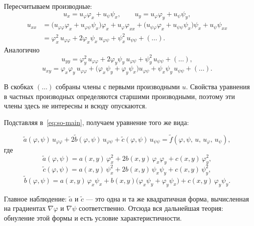 Пересчитываем производные:
\[
  u_x = u_\varphi \varphi_x + u_\psi \psi_x , \qquad
  u_y = u_\varphi \varphi_y + u_\psi \psi_y ,
\]
\begin{align*}
  u_{xx} &= \big(u_{\varphi\varphi}\varphi_x + u_{\varphi\psi}\psi_x\big)\varphi_x
          + u_\varphi \varphi_{xx}
          + \big(u_{\psi\varphi}\varphi_x + u_{\psi\psi}\psi_x\big)\psi_x
          + u_\psi \psi_{xx} \\[4pt]
         &= \varphi_x^2\, u_{\varphi\varphi}
          + 2\varphi_x \psi_x\, u_{\varphi\psi}
          + \psi_x^2\, u_{\psi\psi} + (\dots) .
\end{align*}
Аналогично
\[
  u_{yy} = \varphi_y^2\, u_{\varphi\varphi}
         + 2\varphi_y \psi_y\, u_{\varphi\psi}
         + \psi_y^2\, u_{\psi\psi} + (\dots) ,
\]
\[
  u_{xy} = \varphi_x \varphi_y\, u_{\varphi\varphi}
         + \big(\varphi_x \psi_y + \varphi_y \psi_x\big) u_{\varphi\psi}
         + \psi_x \psi_y\, u_{\psi\psi} + (\dots) .
\]

\begin{idea}
В скобках $(\dots)$ собраны члены с первыми производными $u$. Свойства
уравнения в частных производных определяются старшими производными, поэтому
эти члены здесь не интересны и всюду опускаются.
\end{idea}

Подставляя в~\eqref{eq:so-main}, получаем уравнение того же вида:

\begin{equation}\tag{2}\label{eq:so-new}
  \widetilde a(\varphi,\psi)\, u_{\varphi\varphi}
  + 2\widetilde b(\varphi,\psi)\, u_{\varphi\psi}
  + \widetilde c(\varphi,\psi)\, u_{\psi\psi}
  = \widetilde f(\varphi,\psi,\,u,\,u_\varphi,\,u_\psi) ,
\end{equation}
где
\[
  \widetilde a(\varphi,\psi)
    = a(x,y)\,\varphi_x^2 + 2b(x,y)\,\varphi_x \varphi_y + c(x,y)\,\varphi_y^2 ,
\]
\[
  \widetilde c(\varphi,\psi)
    = a(x,y)\,\psi_x^2 + 2b(x,y)\,\psi_x \psi_y + c(x,y)\,\psi_y^2 ,
\]
\[
  \widetilde b(\varphi,\psi)
    = a(x,y)\,\varphi_x \psi_x
    + b(x,y)\big(\varphi_x \psi_y + \varphi_y \psi_x\big)
    + c(x,y)\,\varphi_y \psi_y .
\]


\begin{idea}
Главное наблюдение: $\widetilde a$ и $\widetilde c$ — это одна и та же
квадратичная форма, вычисленная на градиентах $\nabla\varphi$ и $\nabla\psi$
соответственно. Отсюда вся дальнейшая теория: обнуление этой формы и есть
условие характеристичности.
\end{idea}

